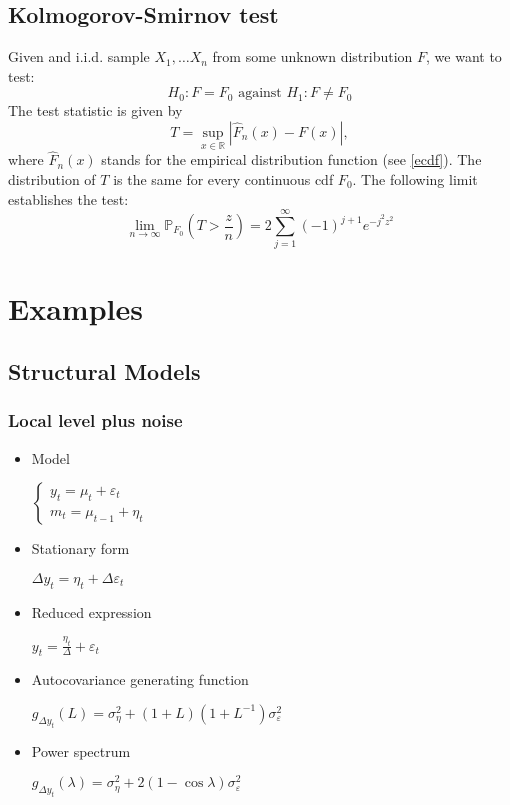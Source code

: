\documentclass[12pt]{article}
\theoremstyle{definition}
\theoremstyle{remark}
\numberwithin{equation}{section}
\newcommand{\RR}{\mathbb{R}}
\newcommand{\PP}{\mathbb{P}}
\begin{document}
\subsection{Kolmogorov-Smirnov test}
Given and i.i.d. sample $X_1, \ldots X_n$ from some unknown distribution $F$, we want to test:
\begin{equation}\label{kstest}
H_0: F = F_0 \text{ against } H_1: F\neq F_0
\end{equation}
The test statistic is given by
\begin{equation}\label{ksstatistic}
	T = \sup_{x\in\RR} |\hat F_n(x) - F(x)|,
\end{equation}
where $\hat F_n(x)$ stands for the empirical distribution function (see \ref{ecdf}). The distribution of $T$ is the same for every continuous cdf $F_0$. The following limit establishes the test:
\begin{equation}
\lim_{n\rightarrow \infty}\PP_{F_0}\left(T > \frac zn\right) = 2\sum_{j = 1}^\infty(-1)^{j+1}e^{-j^2z^2}
\end{equation}



\section{Examples}
\subsection{Structural Models}
\subsubsection{Local level plus noise}
\begin{itemize}
	\item Model

	$\begin{cases}
		y_t = \mu_t+\varepsilon_t\\
		m_t = \mu_{t-1}+\eta_t
	\end{cases}$

	\item Stationary form

	$\Delta y_t = \eta_t + \Delta \varepsilon_t$

	\item Reduced expression

	$\displaystyle y_t = \frac {\eta_t} \Delta + \varepsilon_t$

	\item Autocovariance generating function

	$g_{\Delta y_t}(L) = \sigma^2_{\eta} + (1+L)(1+L^{-1})\sigma^2_{\varepsilon}$

	\item Power spectrum

	$g_{\Delta y_t}(\lambda) = \sigma^2_{\eta} + 2(1-\cos \lambda)\sigma^2_{\varepsilon}$

\end{itemize}
\end{document}
